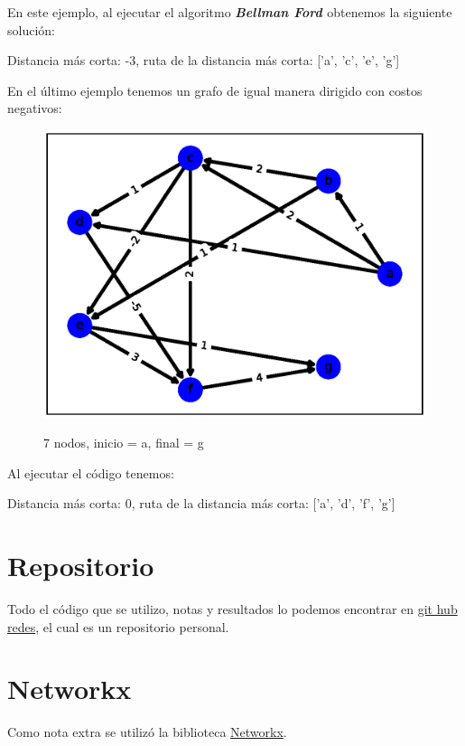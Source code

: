 \documentclass{report}
\newcommand{\bell}{{\bfseries {\textit{Bellman Ford }}}}
\begin{document}
En este ejemplo, al ejecutar el algoritmo \bell obtenemos la siguiente solución:
\begin{center}
    Distancia más corta:
    -3, ruta de la distancia más corta:
    ['a', 'c', 'e', 'g']
\end{center}

En el último ejemplo tenemos un grafo de igual manera dirigido con costos negativos:

\begin{figure}[h!t]
    \centering
    \includegraphics[scale = 0.5]{ejemplo7.eps}
    \label{figura7}
    \caption{7 nodos, inicio = a, final = g}
\end{figure}

Al ejecutar el código tenemos:
\begin{center}
    Distancia más corta:
    0, ruta de la distancia más corta:
    ['a', 'd', 'f', 'g']
\end{center}

\section{Repositorio}
Todo el código que se utilizo, notas y resultados lo podemos encontrar en \href{https://github.com/arnoldae9/redes.git}{git hub redes}, el cual es un repositorio personal.

\section{Networkx}
Como nota extra se utilizó la biblioteca \href{https://networkx.org/}{Networkx}.
\end{document}
